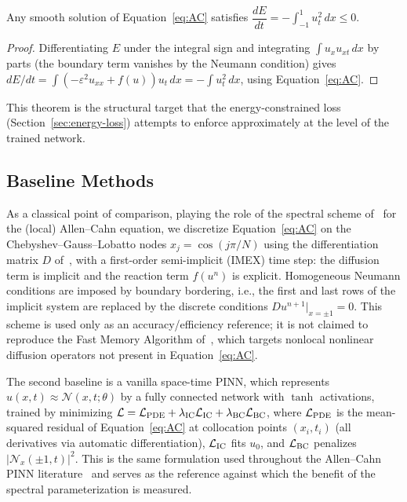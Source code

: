 \documentclass[symmetry,article,submit,moreauthors]{Definitions/mdpi}
\begin{document}
\begin{Theorem}\label{thm:energy}
Any smooth solution of Equation~\eqref{eq:AC} satisfies $\dfrac{dE}{dt}=-\displaystyle\int_{-1}^{1}u_t^2\,dx\le0$.
\end{Theorem}
\begin{proof}
Differentiating $E$ under the integral sign and integrating $\int u_x u_{xt}\,dx$ by parts (the boundary term vanishes by the Neumann condition) gives $dE/dt=\int(-\varepsilon^2u_{xx}+f(u))u_t\,dx=-\int u_t^2\,dx$, using Equation~\eqref{eq:AC}.
\end{proof}

This theorem is the structural target that the energy-constrained loss (Section~\ref{sec:energy-loss}) attempts to enforce approximately at the level of the trained network.

\subsection{Baseline Methods}\label{sec:cheb-baseline}

As a classical point of comparison, playing the role of the spectral scheme of~\cite{Shiyapov2026} for the (local) Allen--Cahn equation, we discretize Equation~\eqref{eq:AC} on the Chebyshev--Gauss--Lobatto nodes $x_j=\cos(j\pi/N)$ using the differentiation matrix $D$ of~\cite{Trefethen}, with a first-order semi-implicit (IMEX) time step: the diffusion term is implicit and the reaction term $f(u^n)$ is explicit. Homogeneous Neumann conditions are imposed by boundary bordering, i.e., the first and last rows of the implicit system are replaced by the discrete conditions $Du^{n+1}|_{x=\pm1}=0$. This scheme is used only as an accuracy/efficiency reference; it is not claimed to reproduce the Fast Memory Algorithm of~\cite{Shiyapov2026}, which targets nonlocal nonlinear diffusion operators not present in Equation~\eqref{eq:AC}.

The second baseline is a vanilla space-time PINN, which represents $u(x,t)\approx\mathcal N(x,t;\theta)$ by a fully connected network with $\tanh$ activations, trained by minimizing $\mathcal L=\mathcal L_{\rm PDE}+\lambda_{\rm IC}\mathcal L_{\rm IC}+\lambda_{\rm BC}\mathcal L_{\rm BC}$, where $\mathcal L_{\rm PDE}$ is the mean-squared residual of Equation~\eqref{eq:AC} at collocation points $(x_i,t_i)$ (all derivatives via automatic differentiation), $\mathcal L_{\rm IC}$ fits $u_0$, and $\mathcal L_{\rm BC}$ penalizes $|\mathcal N_x(\pm1,t)|^2$. This is the same formulation used throughout the Allen--Cahn PINN literature~\cite{Raissi,Wight,Mattey} and serves as the reference against which the benefit of the spectral parameterization is measured.
\end{document}
